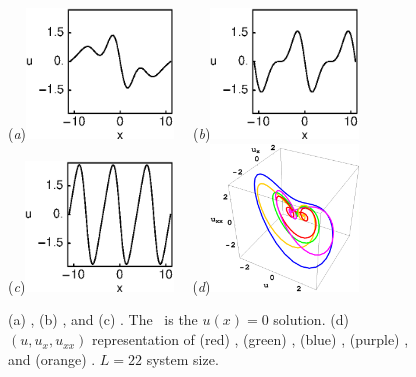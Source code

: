 %
\begin{figure}[t]
\begin{center}
  (\textit{a})\!\!\includegraphics[width=0.35\textwidth]{figs/1wKS22equil.eps}
~~(\textit{b})\!\!\includegraphics[width=0.35\textwidth]{figs/2wKS22equil.eps}
\\
  (\textit{c})\!\!\includegraphics[width=0.35\textwidth]{figs/3wKS22equil.eps}
~~(\textit{d})\!\!\includegraphics[width=0.35\textwidth]{figs/equilSpatial.eps}
\end{center}
\caption{
(a) , (b) , and (c)
 \eqva. The  \eqv\ is the $u(x)=0$ solution.
(d) $(u,u_x,u_{xx})$ representation
of (red) , (green) ,  (blue)  \eqva,
(purple) ,  and (orange)  \reqva.
$L=22$ system size.
    }
\label{f:KS22Equil}
\end{figure}

